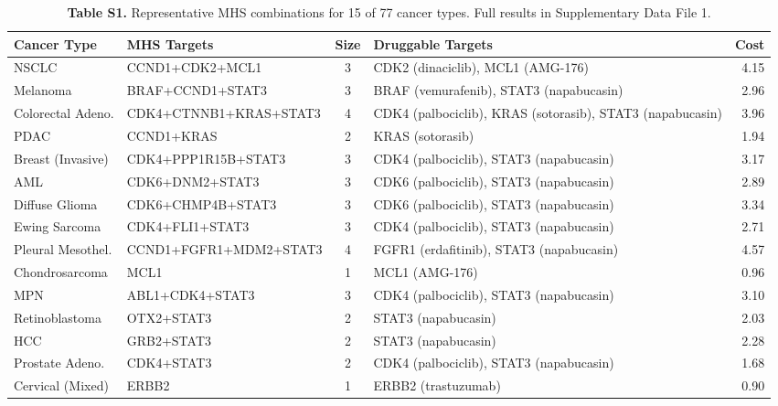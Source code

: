 \documentclass[11pt]{article}
\begin{document}
\begin{table}[htbp]
\centering
\caption{\textbf{Table S1.} Representative MHS combinations for 15 of 77 cancer types. Full results in Supplementary Data File 1.}
\scriptsize
\setlength{\tabcolsep}{4pt}
\begin{tabular}{@{}p{2.8cm}lcp{5.8cm}r@{}}
\toprule
\textbf{Cancer Type} & \textbf{MHS Targets} & \textbf{Size} & \textbf{Druggable Targets} & \textbf{Cost} \\
\midrule
NSCLC & CCND1+CDK2+MCL1 & 3 & CDK2 (dinaciclib), MCL1 (AMG-176) & 4.15 \\
Melanoma & BRAF+CCND1+STAT3 & 3 & BRAF (vemurafenib), STAT3 (napabucasin) & 2.96 \\
Colorectal Adeno. & CDK4+CTNNB1+KRAS+STAT3 & 4 & CDK4 (palbociclib), KRAS (sotorasib), STAT3 (napabucasin) & 3.96 \\
PDAC & CCND1+KRAS & 2 & KRAS (sotorasib) & 1.94 \\
Breast (Invasive) & CDK4+PPP1R15B+STAT3 & 3 & CDK4 (palbociclib), STAT3 (napabucasin) & 3.17 \\
AML & CDK6+DNM2+STAT3 & 3 & CDK6 (palbociclib), STAT3 (napabucasin) & 2.89 \\
Diffuse Glioma & CDK6+CHMP4B+STAT3 & 3 & CDK6 (palbociclib), STAT3 (napabucasin) & 3.34 \\
Ewing Sarcoma & CDK4+FLI1+STAT3 & 3 & CDK4 (palbociclib), STAT3 (napabucasin) & 2.71 \\
Pleural Mesothel. & CCND1+FGFR1+MDM2+STAT3 & 4 & FGFR1 (erdafitinib), STAT3 (napabucasin) & 4.57 \\
Chondrosarcoma & MCL1 & 1 & MCL1 (AMG-176) & 0.96 \\
MPN & ABL1+CDK4+STAT3 & 3 & CDK4 (palbociclib), STAT3 (napabucasin) & 3.10 \\
Retinoblastoma & OTX2+STAT3 & 2 & STAT3 (napabucasin) & 2.03 \\
HCC & GRB2+STAT3 & 2 & STAT3 (napabucasin) & 2.28 \\
Prostate Adeno. & CDK4+STAT3 & 2 & CDK4 (palbociclib), STAT3 (napabucasin) & 1.68 \\
Cervical (Mixed) & ERBB2 & 1 & ERBB2 (trastuzumab) & 0.90 \\
\bottomrule
\end{tabular}
\normalsize
\end{table}
\end{document}
